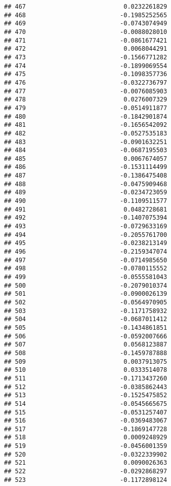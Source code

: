 \documentclass[
]{article}
\begin{document}
\begin{verbatim}
## 467                           0.0232261829
## 468                          -0.1985252565
## 469                          -0.0743074949
## 470                          -0.0088028010
## 471                          -0.0861677421
## 472                           0.0068044291
## 473                          -0.1566771282
## 474                          -0.1899069554
## 475                          -0.1098357736
## 476                          -0.0322736797
## 477                          -0.0076085903
## 478                           0.0276007329
## 479                          -0.0514911877
## 480                          -0.1842901874
## 481                          -0.1656542092
## 482                          -0.0527535183
## 483                          -0.0901632251
## 484                          -0.0687195503
## 485                           0.0067674057
## 486                          -0.1531114499
## 487                          -0.1386475408
## 488                          -0.0475909468
## 489                          -0.0234723059
## 490                          -0.1109511577
## 491                           0.0482728681
## 492                          -0.1407075394
## 493                          -0.0729633169
## 494                          -0.2055761700
## 495                          -0.0238213149
## 496                          -0.2159347074
## 497                          -0.0714985650
## 498                          -0.0780115552
## 499                          -0.0555581043
## 500                          -0.2079010374
## 501                          -0.0900026139
## 502                          -0.0564970905
## 503                          -0.1171758932
## 504                          -0.0687011412
## 505                          -0.1434861851
## 506                          -0.0592007666
## 507                           0.0568123887
## 508                          -0.1459787888
## 509                           0.0037913075
## 510                           0.0333514078
## 511                          -0.1713437260
## 512                          -0.0385862443
## 513                          -0.1525475852
## 514                          -0.0545665675
## 515                          -0.0531257407
## 516                          -0.0369483067
## 517                          -0.1869147728
## 518                           0.0009248929
## 519                          -0.0456001359
## 520                          -0.0322339902
## 521                           0.0090026363
## 522                          -0.0292868297
## 523                          -0.1172898124

\end{verbatim}
\end{document}
